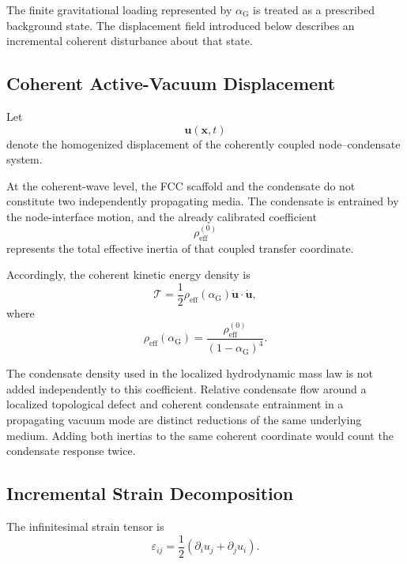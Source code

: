 The finite gravitational loading represented by $\alpha_{\mathrm{G}}$ is treated as a prescribed background state. The displacement field introduced below describes an incremental coherent disturbance about that state.

\subsection{Coherent Active-Vacuum Displacement}

Let
\begin{equation}
    \mathbf{u}(\mathbf{x},t)
\end{equation}
denote the homogenized displacement of the coherently coupled node--condensate system.

At the coherent-wave level, the FCC scaffold and the condensate do not constitute two independently propagating media. The condensate is entrained by the node-interface motion, and the already calibrated coefficient
\begin{equation}
    \rho_{\mathrm{eff}}^{(0)}
\end{equation}
represents the total effective inertia of that coupled transfer coordinate.

Accordingly, the coherent kinetic energy density is
\begin{equation}
    \boxed{ \mathcal{T} = \frac{1}{2} \rho_{\mathrm{eff}} \left( \alpha_{\mathrm{G}} \right) \dot{\mathbf{u}} \cdot \dot{\mathbf{u}} },
\end{equation}
where
\begin{equation}
    \boxed{ \rho_{\mathrm{eff}} \left( \alpha_{\mathrm{G}} \right) = \frac{ \rho_{\mathrm{eff}}^{(0)} }{ \left( 1-\alpha_{\mathrm{G}} \right)^4 } }.
\end{equation}

The condensate density used in the localized hydrodynamic mass law is not added independently to this coefficient. Relative condensate flow around a localized topological defect and coherent condensate entrainment in a propagating vacuum mode are distinct reductions of the same underlying medium. Adding both inertias to the same coherent coordinate would count the condensate response twice.

\subsection{Incremental Strain Decomposition}

The infinitesimal strain tensor is
\begin{equation}
    \varepsilon_{ij} = \frac{1}{2} \left( \partial_i u_j + \partial_j u_i \right).
\end{equation}


